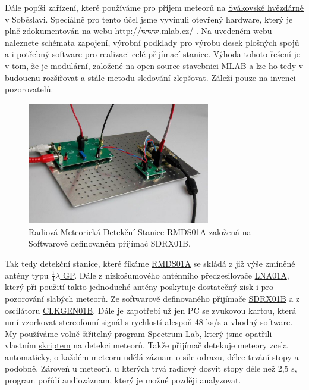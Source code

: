 \documentclass[10pt,a5paper,twoside]{book}
\begin{document}
Dále popíši zařízení, které používáme pro příjem meteorů na \href{http://www.astrozor.cz/index.php?udalost=5}{Svákovské hvězdárně} v Soběslavi. Speciálně pro tento účel jsme vyvinuli otevřený hardware, který je plně zdokumentován na webu \url{http://www.mlab.cz/} . Na uvedeném webu naleznete schémata zapojení, výrobní podklady pro výrobu desek plošných spojů a i potřebný software pro realizaci celé přijímací stanice. Výhoda tohoto řešení je v tom, že je modulární, založené na open source stavebnici MLAB a lze ho tedy v budoucnu rozšiřovat a stále metodu sledování zlepšovat. Záleží pouze na invenci pozorovatelů.
\begin{figure}[htbp]
	\begin{center}
		\includegraphics[width=8cm]{graves/graves_soubory/image006.eps}
	  	\caption{Radiová Meteorická Detekční Stanice RMDS01A založená na Softwarově definovaném přijímač SDRX01B.}
	  	\label{fig:}
	\end{center}
\end{figure}
Tak tedy detekční stanice, které říkáme \href{http://wiki.mlab.cz/doku.php?id=cs:rmds}{RMDS01A} se skládá z již výše zmíněné antény typu \href{http://www.ccars.org/projects/2mgp/tech_2mgp.htm}{$\frac{1}{4}\lambda$ GP}. Dále z nízkošumového anténního předzesilovače \href{http://wiki.mlab.cz/doku.php?id=cs:lna}{LNA01A}, který při použití takto jednoduché antény poskytuje dostatečný zisk i pro pozorování slabých meteorů. Ze softwarově definovaného přijímače \href{http://wiki.mlab.cz/doku.php?id=cs:sdrx}{SDRX01B} a z oscilátoru \href{http://www.mlab.cz/Modules/Clock/CLKGEN01B/DOC/CLKGEN01B.cs.pdf}{CLKGEN01B}. Dále je zapotřebí už jen PC se zvukovou kartou, která umí vzorkovat stereofonní signál s rychlostí alespoň 48 ks/s a vhodný software. My používáme volně šiřitelný program \href{http://www.qsl.net/dl4yhf/spectra1.html}{Spectrum Lab}, který jsme opatřili vlastním \href{http://www.mlab.cz/WebSVN/filedetails.php?repname=MLAB&path=\%2FDesigns\%2FMeasuring_instruments\%2FRMDS01A\%2Fusr\%2FSVAK1_.txt}{skriptem} na detekci meteorů. Takže přijímač detekuje meteory zcela automaticky, o každém meteoru udělá záznam o síle odrazu, délce trvání stopy a podobně. Zároveň u meteorů, u kterých trvá radiový dosvit stopy déle než 2,5 s, program pořídí audiozáznam, který je možné později analyzovat.
\end{document}
